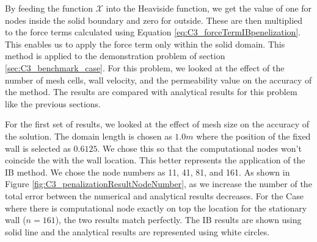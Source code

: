 By feeding the function $\mathcal{X}$ into the Heaviside function, we get the value of one for nodes inside the solid boundary and zero for outside. These are then multiplied to the force terms calculated using Equation \eqref{eq:C3_forceTermIBpenelization}. This enables us to apply the force term only within the solid domain. This method is applied to the demonstration problem of section \ref{sec:C3_benchmark_case}. For this problem, we looked at the effect of the number of mesh cells, wall velocity, and the permeability value on the accuracy of the method. The results are compared with analytical results for this problem like the previous sections.

For the first set of results, we looked at the effect of mesh size on the accuracy of the solution. The domain length is chosen as $1.0 m$ where the position of the fixed wall is selected as $0.6125$. We chose this so that the computational nodes won't coincide the with the wall location. This better represents the application of the IB method. We chose the node numbers as 11, 41, 81, and 161. As shown in Figure \ref{fig:C3_penalizationResultNodeNumber}, as we increase the number of the total error between the numerical and analytical results decreases. For the Case where there is computational node exactly on top the location for the stationary wall ($n=161$), the two results match perfectly. The IB results are shown using solid line and the analytical results are represented using white circles.

